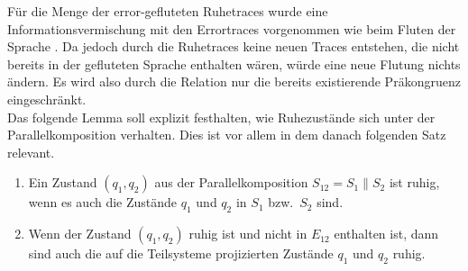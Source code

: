 Für die Menge der error-gefluteten Ruhetraces \QT{} wurde eine Informationsvermischung
mit den Errortraces vorgenommen wie beim Fluten der Sprache \EL{}. Da jedoch
durch die Ruhetraces keine neuen Traces entstehen, die nicht bereits in der
gefluteten Sprache \EL{} enthalten wären, würde eine neue Flutung nichts
ändern. Es wird also durch die Relation \QRel{} nur die
bereits existierende Präkongruenz \ERel{} eingeschränkt.\\
Das folgende Lemma soll explizit festhalten, wie Ruhezustände sich unter der
Parallelkomposition verhalten. Dies ist vor allem in dem danach folgenden Satz
relevant.

\begin{lem}
  \label{lemRuheParallelkomp}
  \begin{enumerate}
    \item Ein Zustand $(q_1,q_2)$ aus der Parallelkomposition $S_{12}=S_1\|S_2$
      ist ruhig, wenn es auch die Zustände $q_1$ und $q_2$ in $S_1$ bzw.\ $S_2$
      sind.
    \item Wenn der Zustand $(q_1,q_2)$ ruhig ist und nicht in $E_{12}$
      enthalten ist, dann sind auch die auf die Teilsysteme projizierten
      Zustände $q_1$ und $q_2$ ruhig.
  \end{enumerate}
\end{lem}

